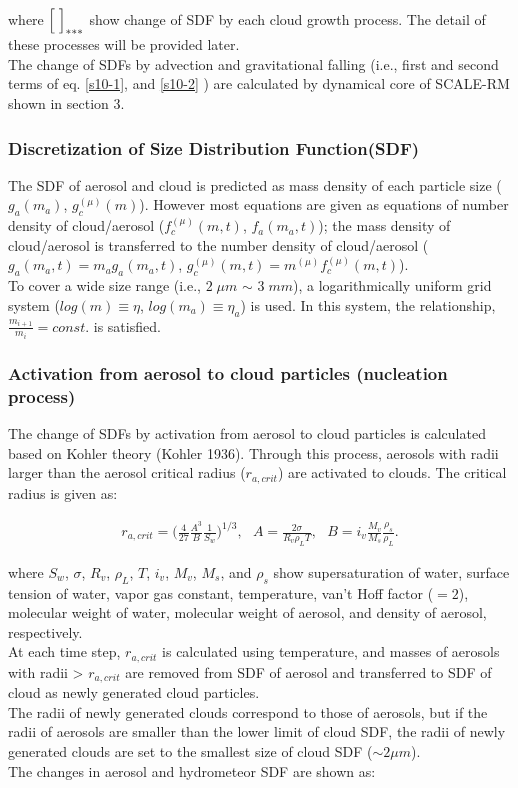 where $\Bigl[\;\Bigr]_{***}$ show change of SDF by each cloud growth process. The detail of these processes will be provided later.\\
 The change of SDFs by advection and gravitational falling (i.e., first and second terms of eq. \ref{s10-1}, and \ref{s10-2}  ) are calculated by dynamical core of SCALE-RM shown in section 3.


\subsubsection{Discretization of Size Distribution Function(SDF)}
The SDF of aerosol and cloud is predicted as mass density of each particle size ($g_{a}(m_{a})$, $g_{c}^{(\mu)}(m)$). However most equations are given as equations of number density of cloud/aerosol ($f_{c}^{(\mu)}(m,t)$, $f_{a}(m_{a},t)$); the mass density of cloud/aerosol is transferred to the number density of cloud/aerosol ($g_{a}(m_{a},t)=m_{a}g_{a}(m_{a},t)$, $g_{c}^{(\mu)}(m,t)=m^{(\mu)}f_{c}^{(\mu)}(m,t)$).\\
To cover a wide size range (i.e., $2\;\mu m$ $\sim$ $3\;mm$), a logarithmically uniform grid system ($log(m)\equiv \eta$, $log(m_{a})\equiv \eta_{a}$) is used. In this system, the relationship, $\frac{m_{i+1}}{m_{i}}=const.$ is satisfied.

\subsubsection{Activation from aerosol to cloud particles (nucleation process)}
The change of SDFs by activation from aerosol to cloud particles is calculated based on Kohler theory (Kohler 1936). Through this process, aerosols with radii larger than the aerosol critical radius ($r_{a,crit}$) are activated to clouds. The critical radius is given as:

\begin{eqnarray}
r_{a,crit}=\bigl( \frac{4}{27}\frac{A^{3}}{B}\frac{1}{S_{w}}\Bigr )^{1/3}, \:\:\:A=\frac{2\sigma}{R_{v}\rho_{L}T},\:\:\: B=i_{v}\frac{M_{v}}{M_{s}}\frac{\rho_{s}}{\rho_{L}}.\label{s10-3}
\end{eqnarray}

where $S_{w}$, $\sigma$, $R_{v}$, $\rho_{L}$, $T$, $i_{v}$, $M_{v}$, $M_{s}$, and $\rho_{s}$ show supersaturation of water, surface tension of water, vapor gas constant, temperature, van't Hoff factor ($=2$), molecular weight of water, molecular weight of aerosol, and density of aerosol, respectively.\\
At each time step, $r_{a,crit}$ is calculated using temperature, and masses of aerosols with radii > $r_{a,crit}$ are removed from SDF of aerosol and 
transferred to SDF of cloud as newly generated cloud particles.\\
The radii of newly generated clouds correspond to those of aerosols, but if the radii of aerosols are smaller than the lower limit of cloud SDF, the radii of newly generated clouds are set to the smallest size of cloud SDF ($\sim 2 \mu m$).\\
The changes in aerosol and hydrometeor SDF are shown as:

